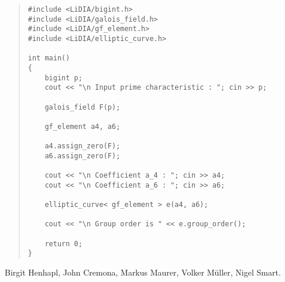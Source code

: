 
\EXAMPLES

\begin{quote}
\begin{verbatim}
#include <LiDIA/bigint.h>
#include <LiDIA/galois_field.h>
#include <LiDIA/gf_element.h>
#include <LiDIA/elliptic_curve.h>

int main()
{
    bigint p;
    cout << "\n Input prime characteristic : "; cin >> p;

    galois_field F(p);

    gf_element a4, a6;

    a4.assign_zero(F);
    a6.assign_zero(F);

    cout << "\n Coefficient a_4 : "; cin >> a4;
    cout << "\n Coefficient a_6 : "; cin >> a6;

    elliptic_curve< gf_element > e(a4, a6);

    cout << "\n Group order is " << e.group_order();

    return 0;
}
\end{verbatim}
\end{quote}



\AUTHOR

Birgit Henhapl, John Cremona, Markus Maurer, Volker M\"uller, Nigel Smart.

